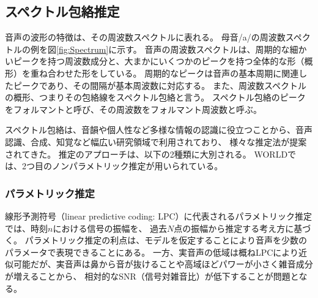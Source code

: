 \subsection{スペクトル包絡推定}

音声の波形の特徴は、その周波数スペクトルに表れる。
母音/a/の周波数スペクトルの例を図\ref{fig:Spectrum}に示す。
音声の周波数スペクトルは、周期的な細かいピークを持つ周波数成分と、大まかにいくつかのピークを持つ全体的な形（概形）を重ね合わせた形をしている。
周期的なピークは音声の基本周期に関連したピークであり、その間隔が基本周波数に対応する。
また、周波数スペクトルの概形、つまりその包絡線をスペクトル包絡と言う。
スペクトル包絡のピークをフォルマントと呼び、その周波数をフォルマント周波数と呼ぶ。

スペクトル包絡は、音韻や個人性など多様な情報の認識に役立つことから、音声認識、合成、知覚など幅広い研究領域で利用されており、
様々な推定法が提案されてきた。
推定のアプローチは、以下の2種類に大別される。
WORLDでは、2つ目のノンパラメトリック推定が用いられている。

\subsubsection{パラメトリック推定}
線形予測符号（linear predictive coding: LPC）に代表されるパラメトリック推定では、時刻$n$における信号の振幅を、
過去$N$点の振幅から推定する考え方に基づく。
パラメトリック推定の利点は、モデルを仮定することにより音声を少数のパラメータで表現できることにある。
一方、実音声の低域は概ねLPCにより近似可能だが、実音声は鼻から音が抜けることや高域ほどパワーが小さく雑音成分が増えることから、
相対的なSNR（信号対雑音比）が低下することが問題となる。


